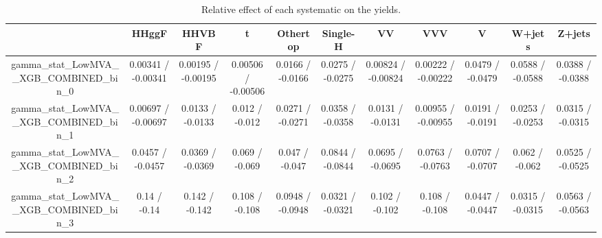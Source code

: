 \documentclass[10pt]{article}
\begin{document}
\begin{table}[htbp]
\begin{center}
\begin{tabular}{|c|c|c|c|c|c|c|c|c|c|c|}
\hline 
      & HHggF      & HHVBF      & t      & Othertop      & Single-H      & VV      & VVV      & V      & W+jets      & Z+jets \\ 
\hline 
  gamma_stat_LowMVA__XGB_COMBINED_bin_0 & 0.00341 / -0.00341 & 0.00195 / -0.00195 & 0.00506 / -0.00506 & 0.0166 / -0.0166 & 0.0275 / -0.0275 & 0.00824 / -0.00824 & 0.00222 / -0.00222 & 0.0479 / -0.0479 & 0.0588 / -0.0588 & 0.0388 / -0.0388 \\ 
  gamma_stat_LowMVA__XGB_COMBINED_bin_1 & 0.00697 / -0.00697 & 0.0133 / -0.0133 & 0.012 / -0.012 & 0.0271 / -0.0271 & 0.0358 / -0.0358 & 0.0131 / -0.0131 & 0.00955 / -0.00955 & 0.0191 / -0.0191 & 0.0253 / -0.0253 & 0.0315 / -0.0315 \\ 
  gamma_stat_LowMVA__XGB_COMBINED_bin_2 & 0.0457 / -0.0457 & 0.0369 / -0.0369 & 0.069 / -0.069 & 0.047 / -0.047 & 0.0844 / -0.0844 & 0.0695 / -0.0695 & 0.0763 / -0.0763 & 0.0707 / -0.0707 & 0.062 / -0.062 & 0.0525 / -0.0525 \\ 
  gamma_stat_LowMVA__XGB_COMBINED_bin_3 & 0.14 / -0.14 & 0.142 / -0.142 & 0.108 / -0.108 & 0.0948 / -0.0948 & 0.0321 / -0.0321 & 0.102 / -0.102 & 0.108 / -0.108 & 0.0447 / -0.0447 & 0.0315 / -0.0315 & 0.0563 / -0.0563 \\ 
\hline 
\end{tabular} 
\caption{Relative effect of each systematic on the yields.} 
\end{center} 
\end{table} 
\end{document}
